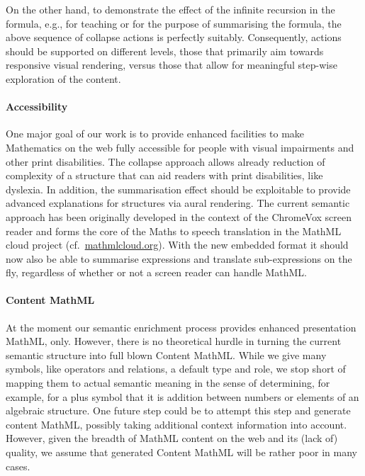 \documentclass{llncs}
\begin{document}
  On the other hand, to demonstrate the effect of the infinite recursion in the
  formula, e.g., for teaching or for the purpose of summarising the formula, the
  above sequence of collapse actions is perfectly suitably. Consequently,
  actions should be supported on different levels, those that primarily aim
  towards responsive visual rendering, versus those that allow for meaningful
  step-wise exploration of the content.

\paragraph{Accessibility}

One major goal of our work is to provide enhanced facilities to make Mathematics
on the web fully accessible for people with visual impairments and other print
disabilities. The collapse approach allows already reduction of complexity of a
structure that can aid readers with print disabilities, like dyslexia. In
addition, the summarisation effect should be exploitable to provide advanced
explanations for structures via aural rendering. The current semantic approach
has been originally developed in the context of the ChromeVox screen reader and
forms the core of the Maths to speech translation in the MathML cloud project
(cf.~\href{https://www.mathmlcloud.org/}{mathmlcloud.org}). With the new
embedded format it should now also be able to summarise expressions and
translate sub-expressions on the fly, regardless of whether or not a screen
reader can handle MathML.

\paragraph{Content MathML}

At the moment our semantic enrichment process provides enhanced presentation
MathML, only. However, there is no theoretical hurdle in turning the current
semantic structure into full blown Content MathML.  While we give many symbols,
like operators and relations, a default type and role, we stop short of mapping
them to actual semantic meaning in the sense of determining, for example, for a
plus symbol that it is addition between numbers or elements of an algebraic
structure. One future step could be to attempt this step and generate content
MathML, possibly taking additional context information into account.  However,
given the breadth of MathML content on the web and its (lack of) quality,
we assume that generated Content MathML will be rather poor in many cases.
\end{document}
